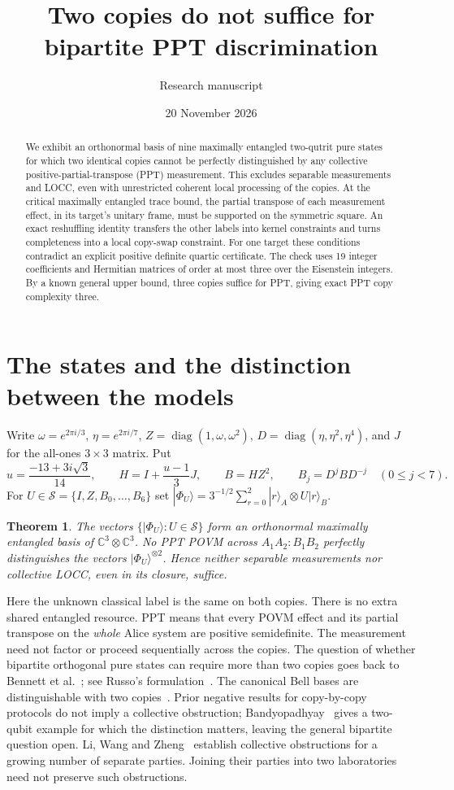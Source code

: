 \documentclass[10pt]{article}
\title{Two copies do not suffice for bipartite PPT discrimination}
\author{Research manuscript}\date{20 November 2026}
\newtheorem{theorem}{Theorem}\newtheorem{lemma}[theorem]{Lemma}
\newcommand{\C}{\mathbb C}\newcommand{\I}{\mathbb I}\newcommand{\ket}[1]{|#1\rangle}\newcommand{\bra}[1]{\langle #1|}
\begin{document}
\maketitle
\begin{abstract}\noindent We exhibit an orthonormal basis of nine maximally entangled two-qutrit pure states for which two identical copies cannot be perfectly distinguished by any collective positive-partial-transpose (PPT) measurement. This excludes separable measurements and LOCC, even with unrestricted coherent local processing of the copies. At the critical maximally entangled trace bound, the partial transpose of each measurement effect, in its target's unitary frame, must be supported on the symmetric square. An exact reshuffling identity transfers the other labels into kernel constraints and turns completeness into a local copy-swap constraint. For one target these conditions contradict an explicit positive definite quartic certificate. The check uses 19 integer coefficients and Hermitian matrices of order at most three over the Eisenstein integers. By a known general upper bound, three copies suffice for PPT, giving exact PPT copy complexity three.
\end{abstract}

\section{The states and the distinction between the models}
Write $\omega=e^{2\pi i/3}$, $\eta=e^{2\pi i/7}$, $Z=\operatorname{diag}(1,\omega,\omega^2)$, $D=\operatorname{diag}(\eta,\eta^2,\eta^4)$, and $J$ for the all-ones $3\times3$ matrix. Put
\[
 u=\frac{-13+3i\sqrt3}{14},\qquad H=I+\frac{u-1}{3}J,\qquad
 B=HZ^2,\qquad B_j=D^j B D^{-j}\quad (0\le j<7).
\]
For $U\in\mathcal S=\{I,Z,B_0,\ldots,B_6\}$ set $\ket{\Phi_U}=3^{-1/2}\sum_{r=0}^2\ket r_A\otimes U\ket r_B$.
\begin{theorem}\label{main}The vectors $\{\ket{\Phi_U}:U\in\mathcal S\}$ form an orthonormal maximally entangled basis of $\C^3\otimes\C^3$. No PPT POVM across $A_1A_2:B_1B_2$ perfectly distinguishes the vectors $\ket{\Phi_U}^{\otimes2}$. Hence neither separable measurements nor collective LOCC, even in its closure, suffice.
\end{theorem}
Here the unknown classical label is the same on both copies. There is no extra shared entangled resource. PPT means that every POVM effect and its partial transpose on the \emph{whole} Alice system are positive semidefinite. The measurement need not factor or proceed sequentially across the copies. The question of whether bipartite orthogonal pure states can require more than two copies goes back to Bennett et al.~\cite{Bennett}; see Russo's formulation~\cite{Russo}. The canonical Bell bases are distinguishable with two copies~\cite{Bell}. Prior negative results for copy-by-copy protocols do not imply a collective obstruction; Bandyopadhyay~\cite{Watrous} gives a two-qubit example for which the distinction matters, leaving the general bipartite question open. Li, Wang and Zheng~\cite{multi} establish collective obstructions for a growing number of separate parties. Joining their parties into two laboratories need not preserve such obstructions.
\end{document}
